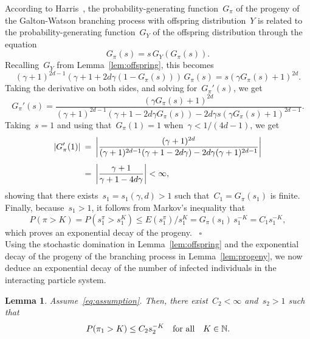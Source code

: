 \documentclass[letterpaper,11pt,twoside,keywordsasfootnote,addressatend,noinfoline]{article}
\newtheorem{lemma}[theorem]{Lemma}
\newenvironment{proof}{\noindent{\bf Proof.}}{\hspace*{2mm}~$\square$}
\newcommand{\N}{\mathbb{N}}
\newcommand{\n}{\hspace*{-5pt}}
\begin{document}
\begin{proof}
 According to Harris~\cite[Section~1.13]{harris_1963}, the probability-generating function~$G_{\pi}$ of the progeny of the Galton-Watson branching process with offspring distribution~$Y$ is related to the probability-generating function~$G_Y$ of the offspring distribution through the equation
 $$ G_{\pi} (s) = s \,G_Y (G_{\pi} (s)). $$
 Recalling~$G_Y$ from Lemma~\ref{lem:offspring}, this becomes
 $$ (\gamma + 1)^{2d - 1} (\gamma + 1 + 2d \gamma (1 - G_{\pi} (s))) \,G_{\pi} (s) = s (\gamma G_{\pi} (s) + 1)^{2d}. $$
 Taking the derivative on both sides,
 and solving for~$G_{\pi}' (s)$, we get
 $$ G_{\pi}' (s) = \frac{(\gamma G_{\pi} (s) + 1)^{2d}}{(\gamma + 1)^{2d - 1} (\gamma + 1 - 2d \gamma G_{\pi} (s)) - 2d \gamma s (\gamma G_{\pi} (s) + 1)^{2d - 1}}. $$
 Taking~$s = 1$ and using that~$G_{\pi} (1) = 1$ when~$\gamma < 1 / (4d - 1)$, we get
 $$ \begin{array}{rcl}
    \displaystyle |G_{\pi}' (1)| & \n = \n &
    \displaystyle \bigg|\frac{(\gamma + 1)^{2d}}{(\gamma + 1)^{2d - 1} (\gamma + 1 - 2d \gamma) - 2d \gamma (\gamma + 1)^{2d - 1}} \bigg| \vspace*{8pt} \\ & \n = \n &
    \displaystyle \bigg|\frac{\gamma + 1}{\gamma + 1 - 4d \gamma} \bigg| < \infty, \end{array} $$
 showing that there exists~$s_1 = s_1 (\gamma, d) > 1$ such that~$C_1 = G_{\pi} (s_1)$ is finite.
 Finally, because~$s_1 > 1$, it follows from Markov's inequality that
 $$ P (\pi > K) = P (s_1^{\pi} > s_1^K) \leq E (s_1^{\pi}) / s_1^K = G_{\pi} (s_1) \,s_1^{-K} = C_1 s_1^{-K}, $$
 which proves an exponential decay of the progeny.
\end{proof} \vspace*{8pt} \\
 Using the stochastic domination in Lemma~\ref{lem:offspring} and the exponential decay of the progeny of the branching process in Lemma~\ref{lem:progeny}, we now deduce an exponential decay of the number of infected individuals in the interacting particle system.
\begin{lemma}
\label{lem:infected}
 Assume~\eqref{eq:assumption}.
 Then, there exist~$C_2 < \infty$ and~$s_2 > 1$ such that
 $$ P (\pi_1 > K) \leq C_2 s_2^{-K} \quad \hbox{for all} \quad K \in \N. $$
\end{lemma}
\end{document}
